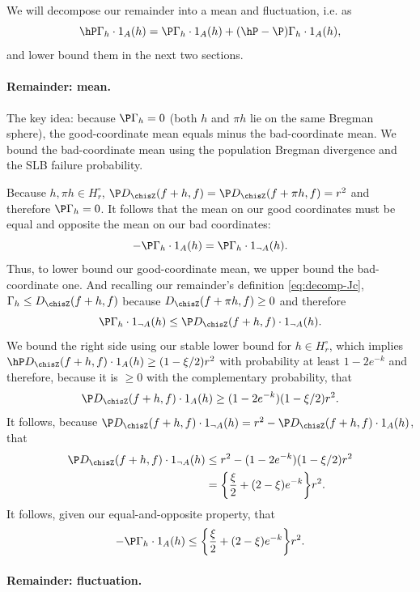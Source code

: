 \documentclass{article}
\begin{document}
We will decompose our remainder into a mean and fluctuation, i.e. as
\[
\hP \Gamma_h \cdot 1_A(h) = \P \Gamma_h \cdot 1_A(h) + (\hP-\P) \Gamma_h \cdot 1_A(h),
\]
and lower bound them in the next two sections.

\paragraph{Remainder: mean.}

The key idea:
because $\P \Gamma_h = 0$
(both $h$ and $\pi h$ lie on the same Bregman sphere),
the good-coordinate mean
equals minus the bad-coordinate mean.
We bound the bad-coordinate mean
using the population Bregman divergence
and the SLB failure probability.

Because $h, \pi h \in H_r^\circ$, $\P D_{\chisZ}(f+h,f) = \P D_{\chisZ}(f+\pi h,f) = r^2$ and therefore $\P \Gamma_h = 0$. It follows that the mean on our good coordinates must be equal and opposite the mean on our bad coordinates:
\[
-\P \Gamma_h \cdot 1_A(h) = \P \Gamma_h \cdot 1_{\neg A}(h).
\]
Thus, to lower bound our good-coordinate mean, we upper bound the bad-coordinate one. And recalling our remainder's definition \eqref{eq:decomp-Jc},
$\Gamma_h \le D_{\chisZ}(f+h, f)$ because $D_{\chisZ}(f+\pi h, f) \ge 0$ and therefore
\[
\P \Gamma_h \cdot 1_{\neg A}(h) \le \P D_{\chisZ}(f+h, f) \cdot 1_{\neg A}(h).
\]
We bound the right side using our stable lower bound for $h \in H_r^\circ$, which implies $\hP D_{\chisZ} (f+h,f) \cdot 1_{A}(h) \ge (1 - \xi/2) r^2$ with probability at least $1 - 2e^{-k}$ and therefore, because it is $\ge 0$ with the complementary probability, that
\[
\P D_{\chisZ}(f+h, f) \cdot 1_{A}(h) \ge (1 - 2e^{-k})(1 - \xi/2) r^2.
\]
It follows, because $\P D_{\chisZ}(f+h, f) \cdot 1_{\neg A}(h) = r^2 - \P D_{\chisZ}(f+h, f) \cdot 1_A(h)$, that
\begin{align*}
\P D_{\chisZ}(f+h, f) \cdot 1_{\neg A}(h) &\le r^2 - (1 - 2e^{-k})(1 - \xi/2) r^2 \\
&= \qty{\frac{\xi}{2} + (2 - \xi) e^{-k}} r^2.
\end{align*}
It follows, given our equal-and-opposite property, that
\begin{equation}\label{eq:mean-bound}
-\P \Gamma_h \cdot 1_A(h) \le \qty{\frac{\xi}{2} + (2 - \xi) e^{-k}} r^2.
\end{equation}

\paragraph{Remainder: fluctuation.}
\end{document}

